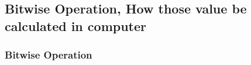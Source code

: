 \documentclass[en, 11pt, xcolor=dvipsnames]{beamer}
\begin{document}
\subsection{Bitwise Operation, How those value be calculated in computer}
\begin{frame}[fragile]
	\frametitle{Bitwise Operation}


	\begin{columns}[c]
		\begin{column}{0.9\textwidth}



\end{column}
\end{columns}
\end{frame}
\end{document}
